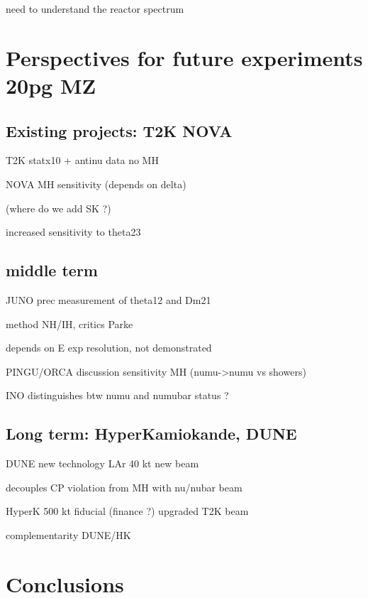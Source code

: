 \documentclass[preprint,12pt]{elsarticle}
\begin{document}
need to understand the reactor spectrum


\section{Perspectives for future experiments 20pg MZ}
\label{sec:future}


\subsection{Existing projects: T2K NOVA}

T2K statx10 + antinu data no MH

NOVA MH sensitivity (depends on delta)

(where do we add  SK ?)

increased sensitivity to theta23


\subsection{middle term}

JUNO prec measurement of theta12 and Dm21

method NH/IH, critics Parke

depends on E exp resolution, not demonstrated

PINGU/ORCA discussion sensitivity MH (numu->numu vs showers)

INO distinguishes btw numu and numubar status ? 


\subsection{Long term: HyperKamiokande, DUNE}

DUNE new technology LAr 40 kt new beam

decouples CP violation from MH with nu/nubar beam

HyperK 500 kt fiducial (finance ?) upgraded T2K beam

complementarity DUNE/HK

\section{Conclusions}
\label{sec:conc}





\end{document}
